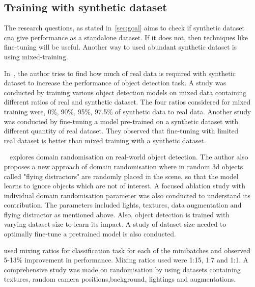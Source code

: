 \subsection{Training with synthetic dataset}\label{subsec:training-with-synthetic-dataset}
The research questions, as stated in~\ref{sec:goal} aims to check if synthetic dataset cna give performance as a standalone dataset.
If it does not, then techniques like fine-tuning will be useful.
Another way to used abundant synthetic dataset is using mixed-training.

In~\cite{nowruzi2019real}, the author tries to find how much of real data is required with synthetic dataset to increase the performance of object detection task.
A study was conducted by training various object detection models on mixed data containing different ratios of real and synthetic dataset.
The four ratios considered for mixed training were, 0\%, 90\%, 95\%, 97.5\% of synthetic data to real data.
Another study was conducted by fine-tuning a model pre-trained on a synthetic dataset with different quantity of real dataset.
They observed that fine-tuning with limited real dataset is better than mixed training with a synthetic dataset.

~\cite{Tremblay2018TrainingDN} explores domain randomisation on real-world object detection.
The author also proposes a new approach of domain randomisation where in random 3d objects called "flying distractors" are randomly placed in the scene,
so that the model learns to ignore objects which are not of interest.
A focused ablation study with individual domain randomisation parameter was also conducted to understand its contribution.
The parameters included lights, textures, data augmentation and flying distractor as mentioned above.
Also, object detection is trained with varying dataset size to learn its impact.
A study of dataset size needed to optimally fine-tune a pretrained model is also conducted.

\cite{2018LearningIC} used mixing ratios for classification task for each of the minibatches and observed 5-13\% improvement in performance.
Mixing ratios used were 1:15, 1:7 and 1:1.
A comprehensive study was made on randomisation by using datasets containing textures, random camera positions,background, lightings and augmentations.

